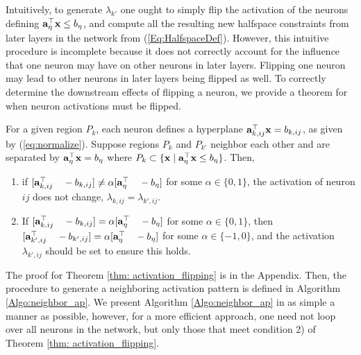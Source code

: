 Intuitively, to generate $\lambda_{k'}$ one ought to simply flip the activation of the neurons defining $\mathbf{a}_\eta^\top \mathbf{x} \le b_\eta$, and compute all the resulting new halfspace constraints from later layers in the network from (\ref{Eq:HalfspaceDef}). However, this intuitive procedure is incomplete because it does not correctly account for the influence that one neuron may have on other neurons in later layers. Flipping one neuron may lead to other neurons in later layers being flipped as well. To correctly determine the downstream effects of flipping a neuron, we provide a theorem for when neuron activations must be flipped.

\begin{theorem}
\label{thm: activation_flipping}
For a given region $P_k$, each neuron defines a hyperplane $\mathbf{a}_{k,ij}^\top \mathbf{x} = b_{k,ij}$, as given by (\ref{eq:normalize}). Suppose regions $P_k$ and $P_{k'}$ neighbor each other and are separated by $\mathbf{a}_\eta^\top \mathbf{x} = b_\eta$ where $P_{k} \subset \{\mathbf{x} \mid \mathbf{a}_\eta^\top \mathbf{x} \le b_\eta \}$. Then,
\begin{enumerate}
    \item if $[\mathbf{a}_{k,ij}^\top\quad  -b_{k,ij}] \neq \alpha[\mathbf{a}_\eta^\top\quad -b_\eta]$ for some $\alpha \in \{0,1\}$, the activation of neuron $ij$ does not change, $\lambda_{k,ij} = \lambda_{k',ij}$.
    \item If $[\mathbf{a}_{k,ij}^\top\quad  -b_{k,ij}] = \alpha[\mathbf{a}_\eta^\top\quad -b_\eta]$ for some $\alpha \in \{0,1\}$, then $[\mathbf{a}_{k',ij}^\top\quad  -b_{k',ij}] = \alpha[\mathbf{a}_\eta^\top\quad -b_\eta]$ for some $\alpha \in \{-1,0\}$, and the activation $\lambda_{k',ij}$ should be set to ensure this holds.
\end{enumerate}
\end{theorem}

The proof for Theorem \ref{thm: activation_flipping} is in the Appendix. Then, the procedure to generate a neighboring activation pattern is defined in Algorithm \ref{Algo:neighbor_ap}. We present Algorithm \ref{Algo:neighbor_ap} in as simple a manner as possible, however, for a more efficient approach, one need not loop over all neurons in the network, but only those that meet condition 2) of Theorem \ref{thm: activation_flipping}.


